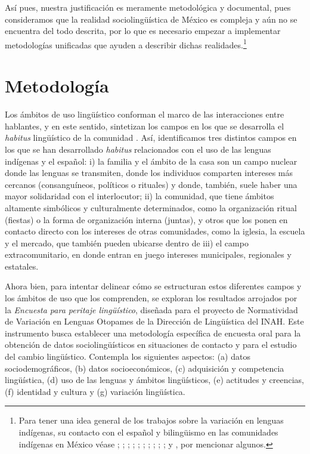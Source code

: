 \documentclass[output=paper]{../langscibook}
\begin{document}
Así pues, nuestra justificación es meramente metodológica y documental, pues consideramos que la realidad sociolingüística de México es compleja y aún no se encuentra del todo descrita, por lo que es necesario empezar a implementar metodologías unificadas que ayuden a describir dichas realidades.\footnote{Para tener una idea general de los trabajos sobre la variación en lenguas indígenas, su contacto con el español y bilingüismo en las comunidades indígenas en México véase \citet{Cifuentes1998};  \citet{FloresFarfán1998};  \citet{GuerreroGalvánSanGiacomo2014}; \citet{Hekking1995};    \citet{HillHill1986}; \citet{Levy1990}; \citet{Lastra2003}; \citet{Pfeiler1988};  \citet{SmithStark2007}; \citet{Suárez1977}; \citet{Villavicencio2006} y \citet{Zimmermann1987,Zimmermann2010}, por mencionar algunos.}


 \section{Metodología}


Los ámbitos de uso lingüístico conforman el marco de las interacciones entre hablantes, y en este sentido, sintetizan los campos en los que se desarrolla el \textit{habitus} lingüístico de la comunidad \citep[109]{Bourdieu1990}. Así, identificamos tres distintos campos en los que se han desarrollado \textit{habitus} relacionados con el uso de las lenguas indígenas y el español: i)  la familia y el ámbito de la casa son un campo nuclear donde las lenguas se transmiten, donde los individuos comparten intereses más cercanos (consanguíneos, políticos o rituales) y donde, también, suele haber una mayor solidaridad con el interlocutor; ii) la comunidad, que tiene ámbitos altamente simbólicos y culturalmente determinados, como la organización ritual (fiestas) o la forma de organización interna (juntas), y otros que los ponen en contacto directo con los intereses de otras comunidades, como la iglesia, la escuela y el mercado, que también pueden ubicarse dentro de iii) el campo extracomunitario, en donde entran en juego intereses municipales, regionales y estatales.

  Ahora bien, para intentar delinear cómo se estructuran estos diferentes campos y los ámbitos de uso que los comprenden, se exploran los resultados arrojados por la \textit {Encuesta para peritaje lingüístico}, diseñada para el proyecto de Normatividad de Variación en Lenguas Otopames de la Dirección de Lingüística del INAH. Este instrumento busca establecer una metodología específica de encuesta oral para la obtención de datos sociolingüísticos en situaciones de contacto y para el estudio del cambio lingüístico. Contempla los siguientes aspectos: (a) datos sociodemográficos, (b) datos socioeconómicos, (c) adquisición y competencia lingüística, (d) uso de las lenguas y ámbitos lingüísticos, (e) actitudes y creencias, (f) identidad y cultura y (g) variación lingüística.
\end{document}

